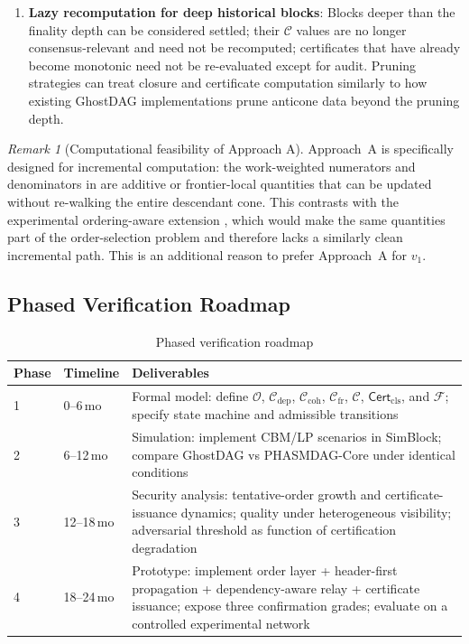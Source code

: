 \documentclass[11pt]{article}
\theoremstyle{definition}
\theoremstyle{plain}
\theoremstyle{remark}
\newtheorem{remark}[definition]{Remark}
\newcommand{\Ostr}{\mathcal{O}}          %
\newcommand{\Clvl}{\mathcal{C}}          %
\newcommand{\Cdep}{\mathcal{C}_{\mathrm{dep}}}
\newcommand{\Ccoh}{\mathcal{C}_{\mathrm{coh}}}
\newcommand{\Cfr}{\mathcal{C}_{\mathrm{fr}}}
\newcommand{\Ffin}{\mathcal{F}}          %
\newcommand{\Certcls}{\mathsf{Cert}_{\mathrm{cls}}}
\begin{document}
\begin{enumerate}[nosep]
    \item \textbf{Lazy recomputation for deep historical blocks}:
    Blocks deeper than the finality depth can be considered settled; their
    $\Clvl$ values are no longer consensus-relevant and need not be
    recomputed; certificates that have already become monotonic need not be
    re-evaluated except for audit.  Pruning strategies can treat closure and
    certificate computation similarly to how existing GhostDAG implementations
    prune anticone data beyond the pruning depth.
\end{enumerate}

\begin{remark}[Computational feasibility of Approach A]\label{rem:approach_a_cost}
Approach~A is specifically designed for incremental computation:
the work-weighted numerators and denominators in
 are additive or frontier-local quantities that
can be updated without re-walking the entire descendant cone.
This contrasts with the experimental ordering-aware extension
, which would make the same quantities part of
the order-selection problem and therefore lacks a similarly clean incremental
path.
This is an additional reason to prefer Approach~A for $v_1$.
\end{remark}

\subsection{Phased Verification Roadmap}

\begin{table}[tbp]
\centering
\caption{Phased verification roadmap}
\label{tab:roadmap}
\small
\renewcommand{\arraystretch}{1.1}
\begin{tabularx}{0.98\textwidth}{@{}L{1.2cm}L{1.7cm}Y@{}}
\toprule
\textbf{Phase} & \textbf{Timeline} & \textbf{Deliverables} \\
 & 0--6\,mo
  & Formal model: define $\Ostr$, $\Cdep$, $\Ccoh$, $\Cfr$, $\Clvl$, $\Certcls$, and $\Ffin$;
    specify state machine and admissible transitions \\
2 & 6--12\,mo
  & Simulation: implement CBM/LP scenarios in SimBlock;
    compare GhostDAG vs PHASMDAG-Core under identical conditions \\
3 & 12--18\,mo
  & Security analysis: tentative-order growth and certificate-issuance dynamics;
    quality under heterogeneous visibility;
    adversarial threshold as function of certification degradation \\
4 & 18--24\,mo
  & Prototype: implement order layer + header-first propagation +
    dependency-aware relay + certificate issuance;
    expose three confirmation grades;
    evaluate on a controlled experimental network \\
\bottomrule
\end{tabularx}
\end{table}
\end{document}
